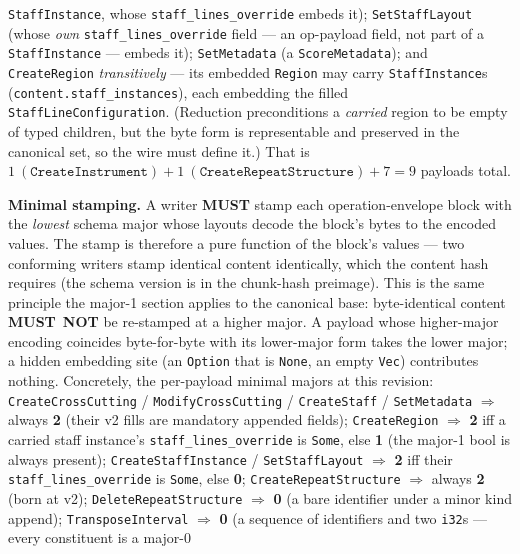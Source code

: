 \documentclass[11pt,letterpaper]{report}
\newcommand{\MUST}{\textbf{MUST}}
\newcommand{\MUSTNOT}{\textbf{MUST}\nobreak\ \textbf{NOT}}
\begin{document}
\begin{itemize}
    \texttt{StaffInstance}, whose \texttt{staff\_lines\_override} embeds
    it); \texttt{SetStaffLayout} (whose \emph{own}
    \texttt{staff\_lines\_override} field --- an op-payload field, not
    part of a \texttt{StaffInstance} --- embeds it); \texttt{SetMetadata}
    (a \texttt{ScoreMetadata}); and \texttt{CreateRegion}
    \emph{transitively} --- its embedded \texttt{Region} may carry
    \texttt{StaffInstance}s (\texttt{content.staff\_instances}), each
    embedding the filled \texttt{StaffLineConfiguration}. (Reduction
    preconditions a \emph{carried} region to be empty of typed children,
    but the byte form is representable and preserved in the canonical
    set, so the wire must define it.) That is
    $1~(\texttt{CreateInstrument}) + 1~(\texttt{CreateRepeatStructure}) +
    7 = 9$ payloads total.

    \textbf{Minimal stamping.} A writer \MUST{} stamp each
    operation-envelope block with the \emph{lowest} schema major whose
    layouts decode the block's bytes to the encoded values. The stamp
    is therefore a pure function of the block's values --- two
    conforming writers stamp identical content identically, which the
    content hash requires (the schema version is in the chunk-hash
    preimage). This is the same principle the major-1 section applies
    to the canonical base: byte-identical content \MUSTNOT{} be
    re-stamped at a higher major. A payload whose higher-major encoding
    coincides byte-for-byte with its lower-major form takes the lower
    major; a hidden embedding site (an \texttt{Option} that is
    \texttt{None}, an empty \texttt{Vec}) contributes nothing.
    Concretely, the per-payload minimal majors at this revision:
    \texttt{CreateCrossCutting} / \texttt{ModifyCrossCutting} /
    \texttt{CreateStaff} / \texttt{SetMetadata} $\Rightarrow$ always
    \textbf{2} (their v2 fills are mandatory appended fields);
    \texttt{CreateRegion} $\Rightarrow$ \textbf{2} iff a carried staff
    instance's \texttt{staff\_lines\_override} is \texttt{Some}, else
    \textbf{1} (the major-1 bool is always present);
    \texttt{CreateStaffInstance} / \texttt{SetStaffLayout}
    $\Rightarrow$ \textbf{2} iff their \texttt{staff\_lines\_override}
    is \texttt{Some}, else \textbf{0};
    \texttt{CreateRepeatStructure} $\Rightarrow$ always \textbf{2}
    (born at v2); \texttt{DeleteRepeatStructure} $\Rightarrow$
    \textbf{0} (a bare identifier under a minor kind append);
    \texttt{TransposeInterval} $\Rightarrow$ \textbf{0} (a sequence of
    identifiers and two \texttt{i32}s --- every constituent is a major-0

\end{itemize}
\end{document}
